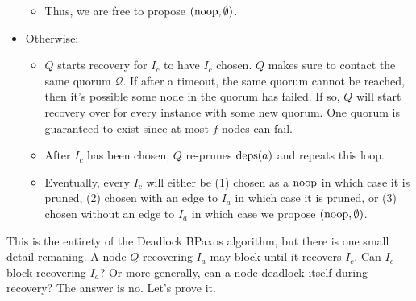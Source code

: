 \begin{itemize}
\begin{itemize}
      \item
        Thus, we are free to propose $(\text{noop}, \emptyset)$.
    \end{itemize}
  \item
    Otherwise:
    \begin{itemize}
      \item
        $Q$ starts recovery for $I_c$ to have $I_c$ chosen. $Q$ makes sure to
        contact the same quorum $\mathcal{Q}$. If after a timeout, the same
        quorum cannot be reached, then it's possible some node in the quorum
        has failed. If so, $Q$ will start recovery over for every instance with
        some new quorum. One quorum is guaranteed to exist since at most $f$
        nodes can fail.

      \item
        After $I_c$ has been chosen, $Q$ re-prunes $\text{deps}(a)$ and repeats this
        loop.

      \item
        Eventually, every $I_c$ will either be (1) chosen as a $\text{noop}$ in which
        case it is pruned, (2) chosen with an edge to $I_a$ in which case it is
        pruned, or (3) chosen without an edge to $I_a$ in which case we propose
        $(\text{noop}, \emptyset)$.
    \end{itemize}
\end{itemize}

This is the entirety of the Deadlock BPaxos algorithm, but there is one small
detail remaning. A node $Q$ recovering $I_a$ may block until it recovers $I_c$.
Can $I_c$ block recovering $I_a$? Or more generally, can a node deadlock itself
during recovery? The answer is no. Let's prove it.

